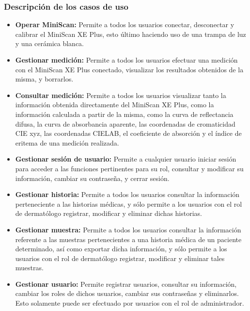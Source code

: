 	\subsubsection{Descripci\'{o}n de los casos de uso}
	
		\begin{itemize}
			\item \textbf{Operar MiniScan:} Permite a todos los usuarios conectar, desconectar y calibrar el MiniScan XE Plus, esto \'{u}ltimo haciendo uso de una trampa de luz y una cer\'{a}mica blanca.
			
			\item \textbf{Gestionar medici\'{o}n:} Permite a todos los usuarios efectuar una medici\'{o}n con el MiniScan XE Plus conectado, visualizar los resultados obtenidos de la misma, y borrarlos.
			
			\item \textbf{Consultar medici\'{o}n:} Permite a todos los usuarios visualizar tanto la informaci\'{o}n obtenida directamente del MiniScan XE Plus, como la informaci\'{o}n calculada a partir de la misma, como la curva de reflectancia difusa, la curva de absorbancia aparente, las coordenadas de cromaticidad CIE xyz, las coordenadas CIELAB, el coeficiente de absorci\'{o}n y el \'{i}ndice de eritema de una medici\'{o}n realizada.
			
			\item \textbf{Gestionar sesi\'{o}n de usuario:} Permite a cualquier usuario iniciar sesi\'{o}n para acceder a las funciones pertinentes para su rol, consultar y modificar su informaci\'{o}n, cambiar su contrase\~{n}a, y cerrar sesi\'{o}n.
			
			\item \textbf{Gestionar historia:} Permite a todos los usuarios consultar la informaci\'{o}n perteneciente a las historias m\'{e}dicas, y s\'{o}lo permite a los usuarios con el rol de dermat\'{o}logo registrar, modificar y eliminar dichas historias. 
			
			\item \textbf{Gestionar muestra:} Permite a todos los usuarios consultar la informaci\'{o}n referente a las muestras pertenecientes a una historia m\'{e}dica de un paciente determinado, as\'{i} como exportar dicha informaci\'{o}n, y s\'{o}lo permite a los usuarios con el rol de dermat\'{o}logo registrar, modificar y eliminar tales muestras.
			
			\item \textbf{Gestionar usuario:} Permite registrar usuarios, consultar su informaci\'{o}n, cambiar los roles de dichos usuarios, cambiar sus contrase\~{n}as y eliminarlos. Esto solamente puede ser efectuado por usuarios con el rol de administrador.
		\end{itemize}

